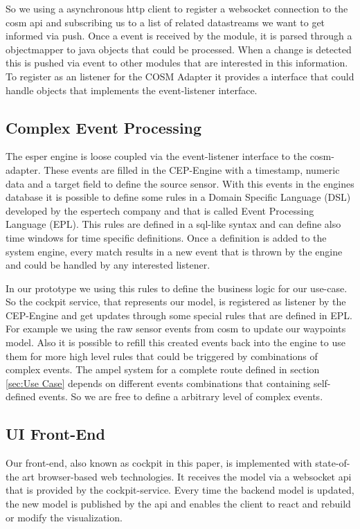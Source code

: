 \documentclass{acm_proc_article-sp}
\begin{document}
So we using a asynchronous http client to register a websocket connection to the cosm api and subscribing us to a list of related datastreams we want to get informed via push.
Once a event is received by the module, it is parsed through a objectmapper to java objects that could be processed. When a change is detected this is pushed via event to other modules that are interested in this information.
To register as an listener for the COSM Adapter it provides a interface that could handle objects that implements the event-listener interface.


\subsection{Complex Event Processing}

The esper engine is loose coupled via the event-listener interface to the cosm-adapter.
These events are filled in the CEP-Engine with a timestamp, numeric data and a target field to define the source sensor.
With this events in the engines database it is possible to define some rules in a Domain Specific Language (DSL) developed by the espertech company and that is called Event Processing Language (EPL). This rules are defined in a sql-like syntax and can define also time windows for time specific definitions.
Once a definition is added to the system engine, every match results in a new event that is thrown by the engine and could be handled by any interested listener.

In our prototype we using this rules to define the business logic for our use-case.
So the cockpit service, that represents our model, is registered as listener by the CEP-Engine and get updates through some special rules that are defined in EPL.
For example we using the raw sensor events from cosm to update our waypoints model.
Also it is possible to refill this created events back into the engine to use them for more high level rules that could be triggered by combinations of complex events.
The ampel system  for a complete route defined in section \ref{sec:Use Case} depends on different events combinations that containing self-defined events.
So we are free to define a arbitrary level of complex events.

\subsection{UI Front-End}
Our front-end, also known as cockpit in this paper, is implemented with state-of-the art browser-based web technologies.
It receives the model via a websocket api that is provided by the cockpit-service.
Every time the backend model is updated, the new model is published by the api and enables the client to react and rebuild or modify the visualization.
\end{document}
